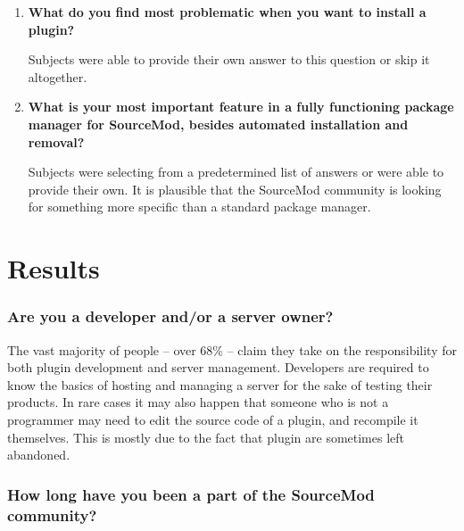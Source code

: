 \begin{enumerate}
    \item \textbf{What do you find most problematic when you want to install a plugin?}

    Subjects were able to provide their own answer to this question or skip it altogether.

    \item \textbf{What is your most important feature in a fully functioning package manager for SourceMod, besides automated installation and removal?}

    Subjects were selecting from a predetermined list of answers or were able to provide their own.
    It is plausible that the SourceMod community is looking for something more specific than a standard package manager.
\end{enumerate}

\section{Results}

\subsubsection{Are you a developer and/or a server owner?}

\begin{figure}[H]
  \centering
\end{figure}

The vast majority of people -- over 68\% -- claim they take on the responsibility for both plugin development and server management.
Developers are required to know the basics of hosting and managing a server for the sake of testing their products.
In rare cases it may also happen that someone who is not a programmer may need to edit the source code of a plugin, and recompile it themselves.
This is mostly due to the fact that plugin are sometimes left abandoned.

\subsubsection{How long have you been a part of the SourceMod community?}


